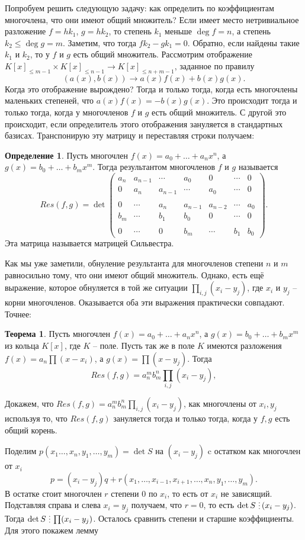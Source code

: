 \documentclass[10pt,a4paper,oneside]{book}
\theoremstyle{definition}
\newtheorem*{defn}{{\color{yellow!30!red} Определение}}
\newtheorem{thm}{{\color{red!40!black} Теорема}}
\newcommand{\di}{\mathop{\,\scalebox{0.85}{\raisebox{-1.2pt}[0.5\height]{\vdots}}\,}}
\def\thrm{\begin{thm}}
\def\ethrm{\end{thm}}
\def\dfn{\begin{defn}}
\def\edfn{\end{defn}}
\begin{document}
Попробуем решить следующую задачу: как определить по коэффициентам многочлена, что они имеют общий множитель? Если имеет место нетривиальное разложение $f=hk_1$, $g=hk_2$, то степень $k_1$ меньше $\deg f=n$, а степень $k_2\leq \deg g=m$. Заметим, что тогда $fk_2-gk_1=0$. Обратно, если найдены такие $k_1$ и $k_2$, то у $f$ и $g$ есть общий множитель. Рассмотрим отображение $K[x]_{\leq m-1}\times K[x]_{\leq n-1} \to K[x]_{\leq n+m-1}$, заданное по правилу
$$(a(x),b(x)) \to a(x)f(x)+b(x)g(x).$$ 
Когда это отображение вырождено? Тогда и только тогда, когда есть многочлены маленьких степеней, что $a(x)f(x)=-b(x)g(x)$. Это происходит тогда и только тогда, когда у многочленов $f$ и $g$ есть общий множитель. С другой это происходит, если определитель этого отображения зануляется в стандартных базисах. Транспонирую эту матрицу и переставляя строки получаем:

\dfn Пусть многочлен $f(x)=a_0+\dots+a_nx^n$, а $g(x)=b_0+\dots+b_mx^m$. Тогда результантом многочленов $f$ и $g$ называется $$Res(f,g)=  \det 
\begin{pmatrix}
a_n & a_{n-1} & \cdots & a_0 & 0 & \cdots & 0 \\
0 & a_n & a_{n-1} & \cdots & a_0 & \cdots & 0 \\
\\
0 & \cdots &  a_n & a_{n-1} & a_{n-2} & \cdots &  a_0 \\
b_m & \cdots & b_1 & b_0 & 0 & \cdots & 0 \\
 \\
0 & \cdots & 0 & b_m & \cdots & b_1 & b_0 
\end{pmatrix}.$$
Эта матрица называется матрицей Сильвестра. 
\edfn

Как мы уже заметили, обнуление результанта для многочленов степени $n$ и $m$ равносильно тому, что они имеют общий множитель. Однако, есть ещё выражение, которое обнуляется в той же ситуации $\prod_{i,j} (x_i-y_j)$, где $x_i$ и $y_j$ -- корни многочленов. Оказывается оба эти выражения практически совпадают. Точнее:

\thrm Пусть многочлен $f(x)=a_0+\dots+a_nx^n$, а $g(x)=b_0+\dots+b_mx^m$ из кольца $K[x]$, где $K$ -- поле. Пусть так же в поле $K$ имеются разложения $f(x)=a_n\prod(x-x_i)$, а $g(x)=\prod (x-y_j)$. Тогда
$$Res(f,g)=a_n^mb_m^n \prod_{i,j} (x_i-y_j),$$
\ethrm
\proof  Докажем, что $Res(f,g)=a_n^mb_m^n \prod_{i,j} (x_i-y_j)$, как многочлены от $x_i, y_j$ используя то, что $Res(f,g)$ зануляется тогда и только тогда, когда у $f,g$ есть общий корень.

Поделим $p(x_1\dots,x_n,y_1,\dots,y_m)=\det S$ на $(x_i-y_j)$ c остатком как многочлен от $x_i$
$$p=(x_i-y_j)q+r(x_1,\dots, x_{i-1},x_{i+1},\dots,x_n,y_1,\dots,y_m).$$
В остатке стоит многочлен $r$ степени 0 по $x_i$, то есть от $x_i$ не зависящий. Подставляя справа и слева $x_i=y_j$ получаем, что $r=0$, то есть $\det S \di (x_i-y_j)$. Тогда $\det S \di \prod (x_i-y_j)$. Осталось сравнить степени и старшие коэффициенты. Для этого покажем лемму
\end{document}
